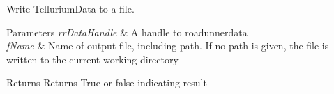 Write Tellurium\-Data to a file. 


\begin{DoxyParams}{Parameters}
{\em rr\-Data\-Handle} & A handle to roadunnerdata \\
\hline
{\em f\-Name} & Name of output file, including path. If no path is given, the file is written to the current working directory \\
\hline
\end{DoxyParams}
\begin{DoxyReturn}{Returns}
Returns True or false indicating result 
\end{DoxyReturn}
